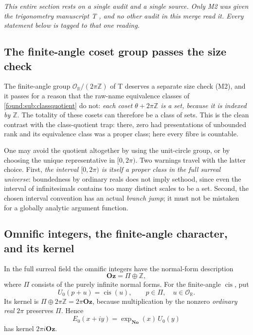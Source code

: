 \documentclass[11pt,letterpaper]{article}
\numberwithin{equation}{section}
\theoremstyle{definition}
\theoremstyle{remark}
\newcommand{\No}{\mathbf{No}}
\newcommand{\Oz}{\mathbf{Oz}}
\newcommand{\R}{\mathbb R}
\newcommand{\Z}{\mathbb Z}
\newcommand{\OO}{\mathcal O}
\newcommand{\cis}{\operatorname{cis}}
\begin{document}
\emph{This entire section rests on a single audit and a single source. Only M2
was given the trigonometry manuscript T \cite{found:SrcTrig}, and no other audit
in this merge read it. Every statement below is tagged to that one reading.}

\subsection{The finite-angle coset group passes the size check}
\label{found:sub:cosets}
The finite-angle group $\OO_\R/(2\pi\Z)$ of T deserves a separate size check
(M2), and it passes for a reason that the raw-name equivalence classes of
\cref{found:sub:classquotient} do not: \emph{each coset $\theta+2\pi\Z$ is a
set, because it is indexed by $\Z$}. The totality of these cosets can therefore
be a class of sets. This is the clean contrast with the class-quotient trap:
there, zero had presentations of unbounded rank and its equivalence class was a
proper class; here every fibre is countable.

One may avoid the quotient altogether by using the unit-circle group, or by
choosing the unique representative in $[0,2\pi)$. Two warnings travel with the
latter choice. First, \emph{the interval $[0,2\pi)$ is itself a proper class in
the full surreal universe}: boundedness by ordinary reals does not imply
sethood, since even the interval of infinitesimals contains too many distinct
scales to be a set. Second, the chosen interval convention has an actual
\emph{branch jump}; it must not be mistaken for a globally analytic argument
function.

\subsection{Omnific integers, the finite-angle character, and its kernel}
\label{found:sub:omnific}
In the full surreal field the omnific integers have the normal-form description
\begin{equation}\label{found:eq:omnific}
 \Oz=\Pi\oplus\Z,
\end{equation}
where $\Pi$ consists of the purely infinite normal forms. For the finite-angle
$\cis$, put
\begin{equation}\label{found:eq:Uzero}
 U_0(p+u)=\cis(u),\qquad p\in\Pi,\quad u\in\OO_\R .
\end{equation}
Its kernel is $\Pi\oplus2\pi\Z=2\pi\Oz$, because multiplication by the nonzero
\emph{ordinary real} $2\pi$ preserves $\Pi$. Hence
\begin{equation}\label{found:eq:Ezero}
 E_0(x+iy)=\exp_{\No}(x)\,U_0(y)
\end{equation}
has kernel $2\pi i\Oz$.
\end{document}
